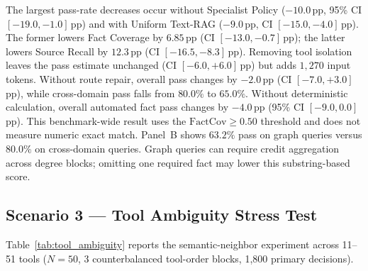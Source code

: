 The largest pass-rate decreases occur without Specialist Policy ($-10.0$\,pp, 95\% CI $[-19.0, -1.0]$\,pp) and with Uniform Text-RAG ($-9.0$\,pp, CI $[-15.0, -4.0]$\,pp). The former lowers Fact Coverage by $6.85$\,pp (CI $[-13.0, -0.7]$\,pp); the latter lowers Source Recall by $12.3$\,pp (CI $[-16.5, -8.3]$\,pp). Removing tool isolation leaves the pass estimate unchanged (CI $[-6.0, +6.0]$\,pp) but adds $1{,}270$ input tokens. Without route repair, overall pass changes by $-2.0$\,pp (CI $[-7.0, +3.0]$\,pp), while cross-domain pass falls from $80.0\%$ to $65.0\%$. Without deterministic calculation, overall automated fact pass changes by $-4.0$\,pp (95\% CI $[-9.0, 0.0]$\,pp). This benchmark-wide result uses the $\text{FactCov} \ge 0.50$ threshold and does not measure numeric exact match. Panel~B shows $63.2\%$ pass on graph queries versus $80.0\%$ on cross-domain queries. Graph queries can require credit aggregation across degree blocks; omitting one required fact may lower this substring-based score.

\subsection{Scenario 3 --- Tool Ambiguity Stress Test}
\label{sec:s3_results}

Table~\ref{tab:tool_ambiguity} reports the semantic-neighbor experiment across 11--51 tools ($N{=}50$, 3 counterbalanced tool-order blocks, 1,800 primary decisions).

